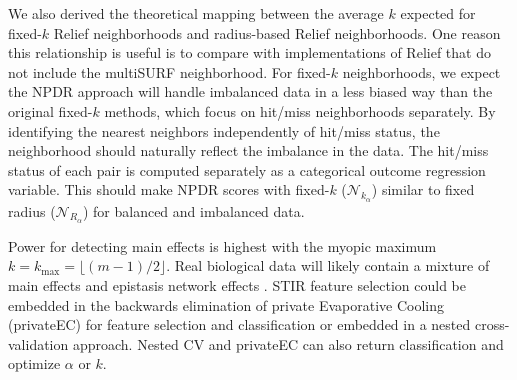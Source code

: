 \documentclass[10pt]{article}
\begin{document}

We also derived the theoretical mapping between the average $k$ expected for fixed-$k$ Relief neighborhoods and radius-based Relief neighborhoods. One reason this relationship is useful is to compare with implementations of Relief that do not include the multiSURF neighborhood. For fixed-$k$ neighborhoods, we expect the NPDR approach will handle imbalanced data in a less biased way than the original fixed-$k$ methods, which focus on hit/miss neighborhoods separately. By identifying the nearest neighbors independently of hit/miss status, the neighborhood should naturally reflect the imbalance in the data. The hit/miss status of each pair is computed separately as a categorical outcome regression variable. This should make NPDR scores with fixed-$k$ ($\mathcal{N}_{k_\alpha}$) similar to fixed radius ($\mathcal{N}_{R_\alpha}$) for balanced and imbalanced data.    

Power for detecting main effects is highest with the myopic maximum $k=k_{\text{max}}=\lfloor (m-1)/2\rfloor$. Real biological data will likely contain a mixture of main effects and epistasis network effects \cite{mckinney_pajewski}. STIR feature selection could be embedded in the backwards elimination of private Evaporative Cooling (privateEC) for feature selection and classification \cite{le17} or embedded in a nested cross-validation approach. Nested CV and privateEC can also return classification and optimize $\alpha$ or $k$. 

\end{document}

